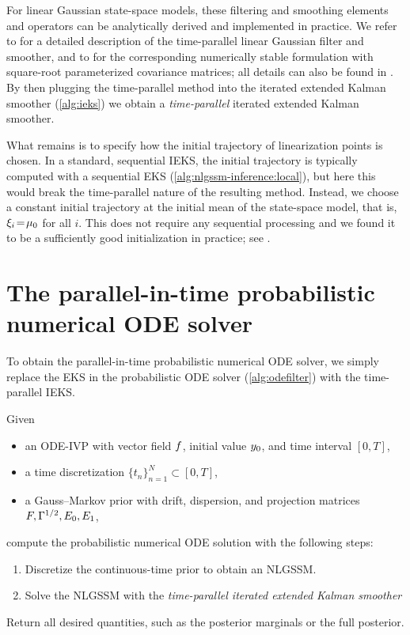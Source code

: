 \documentclass{mimosis}
\begin{document}
For linear Gaussian state-space models, these filtering and smoothing elements and operators can be analytically derived and implemented in practice.
We refer to \textcite{Sarkka2021} for a detailed description of the time-parallel linear Gaussian filter and smoother,
and to \textcite{Yaghoobi2022} for the corresponding numerically stable formulation with square-root parameterized covariance matrices;
all details can also be found in
\pint{}.
By then plugging the time-parallel method into the iterated extended Kalman smoother (\cref{alg:ieks}) we obtain a \emph{time-parallel} iterated extended Kalman smoother.

What remains is to specify how the initial trajectory of linearization points is chosen.
In a standard, sequential IEKS, the initial trajectory is typically computed with a sequential EKS (\cref{alg:nlgssm-inference:local}), but here this would break the time-parallel nature of the resulting method.
Instead, we choose a constant initial trajectory at the initial mean of the state-space model, that is, \(\xi_i \!=\! \mu_{0}\) for all \(i\).
This does not require any sequential processing and we found it to be a sufficiently good initialization in practice; see \pint{}.
\section{The parallel-in-time probabilistic numerical ODE solver}
\label{sec:org18afd4c}
\label{sec:pint:algorithm}

To obtain the parallel-in-time probabilistic numerical ODE solver, we simply replace the EKS in the probabilistic ODE solver (\cref{alg:odefilter}) with the time-parallel IEKS.

\begin{alg}
\label{alg:pintodefilter}
Given
\begin{itemize}[nosep]
\item an ODE-IVP with vector field \(\vf\),
initial value \(y_0\), and
time interval \([0, T]\),
\item a time discretization \(\{t_n\}_{n=1}^N \subset [0, T]\),
\item a Gauss--Markov prior with drift, dispersion, and projection matrices \(F, \Gamma^{1/2}, E_{0}, E_{1}\),
\end{itemize}
compute the probabilistic numerical ODE solution
with the following steps:
\begin{enumerate}[nosep]
\item Discretize the continuous-time prior to obtain an NLGSSM.
\item Solve the NLGSSM with the \emph{time-parallel iterated extended Kalman smoother}
\end{enumerate}
Return all desired quantities, such as the posterior marginals or the full posterior.
\end{alg}
\end{document}

